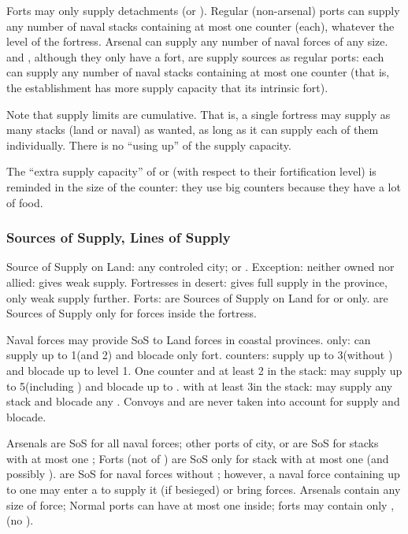 \bparag Forts may only supply detachments (\ND or \NDE).
\bparag Regular (non-arsenal) ports can supply any number of naval stacks
containing at most one \FLEET counter (each), whatever the level of the
fortress.
\bparag Arsenal can supply any number of naval forces of any size.
\bparag \COL and \TP, although they only have a fort, are supply sources as
regular ports: each can supply any number of naval stacks containing at most
one \FLEET counter (that is, the establishment has more supply capacity that
its intrinsic fort).

\begin{designnote}
  Note that supply limits are cumulative. That is, a single fortress may
  supply as many stacks (land or naval) as wanted, as long as it can supply
  each of them individually. There is no ``using up'' of the supply capacity.

  The ``extra supply capacity'' of \COL or \TP (with respect to their
  fortification level) is reminded in the size of the counter: they use big
  counters because they have a lot of food.
\end{designnote}



\subsubsection{Sources of Supply, Lines of Supply}

\bparag Source of Supply on Land: any controled city; \TP or \COL.  Exception:
neither owned nor allied: gives weak supply.  Fortresses in desert: gives full
supply in the province, only weak supply further.
\bparag Forts: are Sources of Supply on Land for \LD or \LDE only.
\bparag \Presidios are Sources of Supply only for forces inside the fortress.

Naval forces may provide SoS to Land forces in coastal provinces.
\bparag \de only: can supply up to 1\LD (and 2\LDE) and blocade only fort.
\bparag \ND counters: supply up to 3\LD (without \ARMY) and blocade up to
\fortress level 1.
\bparag One \FLEET counter and at least 2 \ND in the stack: may supply up to
5\LD (including \ARMY) and blocade up to .
\bparag \FLEET\faceplus with at least 3\ND in the stack: may supply any stack
and blocade any \fortress.
\bparag Convoys and are never taken into account for supply and blocade.

Arsenals are SoS for all naval forces; other ports of city, \COL or \TP are
SoS for stacks with at most one \FLEET;
\bparag Forts (not of \TP) are SoS only for stack with at most one \ND
(and possibly \NDE).
\bparag \Presidios are SoS for naval forces without \FLEET;
however, a naval force containing up to one \FLEET may enter a
\Presidio to supply it (if besieged) or bring forces.
\bparag[Stacking:] Arsenals contain any size of force;
Normal ports can have at most one \FLEET inside;
forts may contain only \ND, \NDE (no \FLEET).

